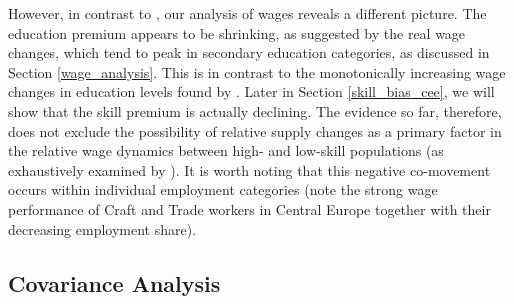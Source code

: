 \documentclass[11pt]{article}
\begin{document}
However, in contrast to \citeauthor{katz1992changes}, our analysis of wages reveals a different picture. The education premium appears to be shrinking, as suggested by the real wage changes, which tend to peak in secondary education categories, as discussed in Section \ref{wage_analysis}. This is in contrast to the monotonically increasing wage changes in education levels found by \citeauthor{katz1992changes}. Later in Section \ref{skill_bias_cee}, we will show that the skill premium is actually declining. The evidence so far, therefore, does not exclude the possibility of relative supply changes as a primary factor in the relative wage dynamics between high- and low-skill populations (as exhaustively examined by \citet{katz1992changes}). It is worth noting that this negative co-movement occurs within individual employment categories (note the strong wage performance of Craft and Trade workers in Central Europe together with their decreasing employment share).




\subsection{Covariance Analysis}\label{covariance_analysis}
\end{document}
